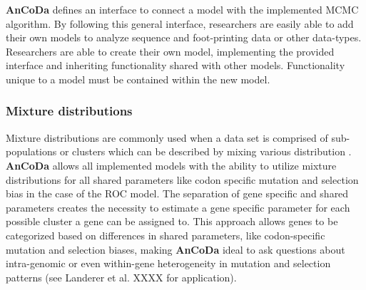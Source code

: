 \documentclass{bioinfo}
\newcommand{\package}{\textbf{AnCoDa }} %
\begin{document}

\package defines an interface to connect a model with the implemented MCMC algorithm. 
By following this general interface, researchers are easily able to add their own models to analyze sequence and foot-printing data or other data-types.
Researchers are able to create their own model, implementing the provided interface and inheriting functionality shared with other models.
Functionality unique to a model must be contained within the new model. 

\subsubsection*{Mixture distributions}
Mixture distributions are commonly used when a data set is comprised of sub-populations or clusters which can be described by mixing various distribution \citep{gelman2013}. 
\package allows all implemented models with the ability to utilize mixture distributions for all shared parameters like codon specific mutation and selection bias in the case of the ROC model. 
The separation of gene specific and shared parameters creates the necessity to estimate a gene specific parameter for each possible cluster a gene can be assigned to. 
This approach allows genes to be categorized based on differences in shared parameters, like codon-specific mutation and selection biases, making \package ideal to ask questions about intra-genomic or even within-gene heterogeneity in mutation and selection patterns (see Landerer et al. XXXX for application). 
\end{document}

